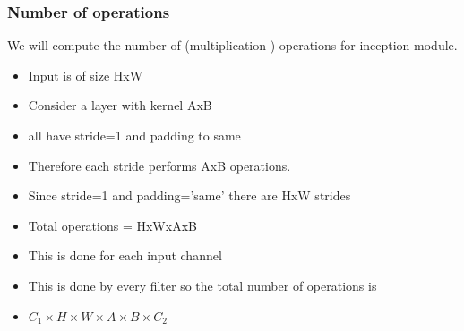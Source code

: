 \documentclass{beamer}
\begin{document}
\begin{frame}
	\frametitle{Number of operations}
	We will compute the number of (multiplication ) operations for inception module.
\begin{itemize}
	\item Input is of size HxW
	\item Consider a layer with kernel AxB
	\item all have stride=1 and padding to same 
	\item Therefore each stride performs AxB operations.
	\item Since stride=1 and padding='same' there are HxW strides
	\item Total operations = HxWxAxB 
	\item This is done for each input channel
	\item This is done by every filter so the total number of operations is 
	\item $C_1\times H\times W\times A\times B\times C_2$ 
\end{itemize}
	

\end{frame}
\end{document}
